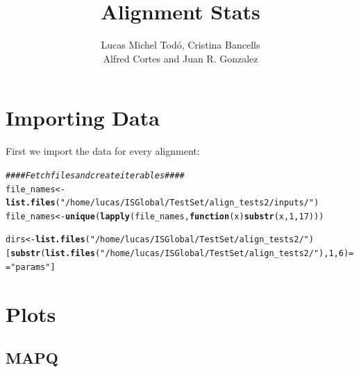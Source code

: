 \documentclass[12pt, a4paper]{article}\usepackage[]{graphicx}\usepackage[]{color}
\title{\textbf{\Large Alignment Stats}}
\author {Lucas Michel Todó, Cristina Bancells\\
Alfred Cortes and Juan R. Gonzalez}
\affil{Barcelona Global Health Institute (ISGlobal), Campus PRBB}
\makeatletter
\newcommand{\hlnum}[1]{\textcolor[rgb]{0.686,0.059,0.569}{#1}}%
\newcommand{\hlstr}[1]{\textcolor[rgb]{0.192,0.494,0.8}{#1}}%
\newcommand{\hlcom}[1]{\textcolor[rgb]{0.678,0.584,0.686}{\textit{#1}}}%
\newcommand{\hlopt}[1]{\textcolor[rgb]{0,0,0}{#1}}%
\newcommand{\hlstd}[1]{\textcolor[rgb]{0.345,0.345,0.345}{#1}}%
\newcommand{\hlkwa}[1]{\textcolor[rgb]{0.161,0.373,0.58}{\textbf{#1}}}%
\newcommand{\hlkwb}[1]{\textcolor[rgb]{0.69,0.353,0.396}{#1}}%
\newcommand{\hlkwc}[1]{\textcolor[rgb]{0.333,0.667,0.333}{#1}}%
\newcommand{\hlkwd}[1]{\textcolor[rgb]{0.737,0.353,0.396}{\textbf{#1}}}%
\newenvironment{kframe}{%
 \def\at@end@of@kframe{}%
 \ifinner\ifhmode%
  \def\at@end@of@kframe{\end{minipage}}%
  \begin{minipage}{\columnwidth}%
 \fi\fi%
 \def\FrameCommand##1{\hskip\@totalleftmargin \hskip-\fboxsep
 \colorbox{shadecolor}{##1}\hskip-\fboxsep
     \hskip-\linewidth \hskip-\@totalleftmargin \hskip\columnwidth}%
 \MakeFramed {\advance\hsize-\width
   \@totalleftmargin\z@ \linewidth\hsize
   \@setminipage}}%
 {\par\unskip\endMakeFramed%
 \at@end@of@kframe}
\newenvironment{knitrout}{}{} %
\makeatother
\begin{document}
\maketitle
\tableofcontents
\newpage



\section{Importing Data}

First we import the data for every alignment:
\begin{knitrout}
\color{fgcolor}\begin{kframe}
\begin{alltt}
\hlcom{####  Fetch files and create iterables ####}
\hlstd{file_names} \hlkwb{<-} \hlkwd{list.files}\hlstd{(}\hlstr{"/home/lucas/ISGlobal/TestSet/align_tests2/inputs/"}\hlstd{)}
\hlstd{file_names} \hlkwb{<-} \hlkwd{unique}\hlstd{(}\hlkwd{lapply}\hlstd{(file_names,} \hlkwa{function}\hlstd{(}\hlkwc{x}\hlstd{)} \hlkwd{substr}\hlstd{(x,}\hlnum{1}\hlstd{,}\hlnum{17}\hlstd{)))}

\hlstd{dirs} \hlkwb{<-} \hlkwd{list.files}\hlstd{(}\hlstr{"/home/lucas/ISGlobal/TestSet/align_tests2/"}\hlstd{)[}\hlkwd{substr}\hlstd{(}\hlkwd{list.files}\hlstd{(}\hlstr{"/home/lucas/ISGlobal/TestSet/align_tests2/"}\hlstd{),}\hlnum{1}\hlstd{,}\hlnum{6}\hlstd{)} \hlopt{==} \hlstr{"params"}\hlstd{]}
\end{alltt}
\end{kframe}
\end{knitrout}

\clearpage
\section{Plots}
\subsection{MAPQ}
\end{document}
